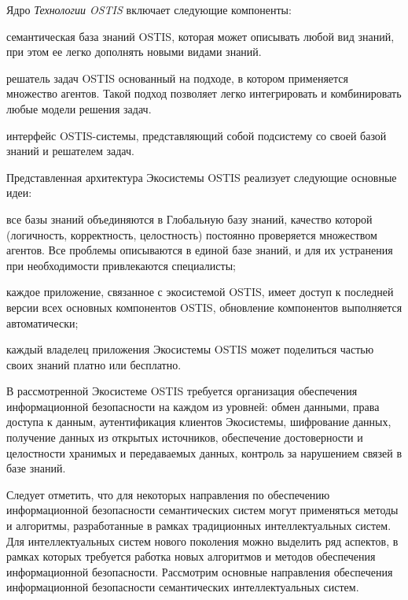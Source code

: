 Ядро \textit{Технологии OSTIS} включает следующие компоненты:
\begin{textitemize}
	\item семантическая база знаний OSTIS, которая может описывать любой вид знаний, при этом ее легко дополнять новыми видами знаний.
	\item решатель задач OSTIS основанный на подходе, в котором применяется множество агентов. Такой подход позволяет легко интегрировать и комбинировать любые модели решения задач.
	\item интерфейс OSTIS-системы, представляющий собой подсистему со своей базой знаний и решателем задач.
\end{textitemize}

Представленная архитектура Экосистемы OSTIS реализует следующие основные идеи:
\begin{textitemize}
	\item все базы знаний объединяются в Глобальную базу знаний, качество которой (логичность, корректность, целостность) постоянно проверяется множеством агентов. Все проблемы описываются в единой базе знаний, и для их устранения при необходимости привлекаются специалисты;
	\item каждое приложение, связанное с экосистемой OSTIS, имеет доступ к последней версии всех основных компонентов OSTIS, обновление компонентов выполняется автоматически;
	\item каждый владелец приложения Экосистемы OSTIS может поделиться частью своих знаний платно или бесплатно.
\end{textitemize}

В рассмотренной Экосистеме OSTIS требуется организация обеспечения информационной безопасности на каждом из уровней: обмен данными, права доступа к данным, аутентификация клиентов Экосистемы, шифрование данных, получение данных из открытых источников, обеспечение достоверности и целостности хранимых и передаваемых данных, контроль за нарушением связей в базе знаний.

Следует отметить, что для некоторых направления по обеспечению информационной безопасности семантических систем могут применяться методы и алгоритмы, разработанные в рамках традиционных интеллектуальных систем. Для интеллектуальных систем нового поколения можно выделить ряд аспектов, в рамках которых требуется работка новых алгоритмов и методов обеспечения информационной безопасности. Рассмотрим основные направления обеспечения информационной безопасности семантических интеллектуальных систем.

